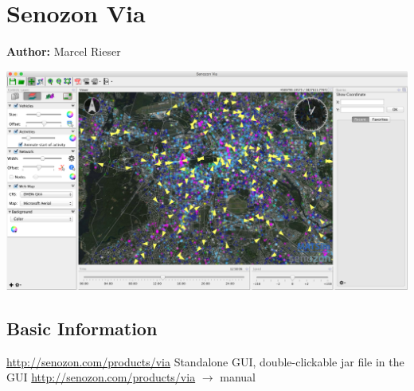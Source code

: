 \chapter{Senozon Via}
\label{ch:via}

\hfill \textbf{Author:} Marcel Rieser

\begin{center} \includegraphics[width=1.\textwidth, angle=0]{extending/figures/via/title.png} \end{center}


\section{Basic Information}

\createStandardInformationBasic%
{\url{http://senozon.com/products/via}}%
{Standalone GUI, double-clickable jar file}%
{in the GUI}%
{\url{http://senozon.com/products/via} $\to$ manual}

\def\Via{\emph{Via}}
